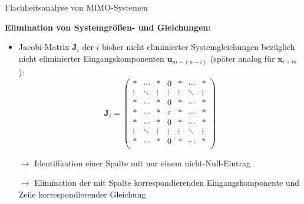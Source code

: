 \documentclass[
	ngerman,
	10pt,				%
	aspectratio=169 	%
]{beamer}
\begin{document}
\begin{frame}[t,fragile,label=Flachheit_3]{\large Flachheitsanalyse von MIMO-Systemen}
	
	\textbf{Elimination von Systemgrößen- und Gleichungen:}
	
	\begin{itemize}
		\pause
		\item Jacobi-Matrix $\mathbf{J}_i$ der $i$ bisher nicht eliminierter Systemgleichungen bezüglich nicht eliminierter Eingangskomponenten $\mathbf{u}_{m-(n-i)}$ (später analog für $\mathbf{x}_{i+m}$): \\
		\pause
		\begin{equation*}
			\mathbf{J}_i = 
			\begin{pmatrix}
				* & \cdots & * & 0 & * & \cdots & *\\
				\vdots & \ddots & \vdots & \vdots & \vdots & \ddots & \vdots \\
				* & \cdots & * & 0 & * & \cdots & *  \\
				* & \cdots & * & \varepsilon & * & \cdots & * \\
				* & \cdots & * & 0 & * & \cdots & *  \\
				\vdots & \ddots & \vdots & \vdots & \vdots & \ddots & \vdots \\
				* & \cdots & * & 0 & * & \cdots & *\\
			\end{pmatrix}
		\end{equation*}
		\pause
		\item[$\rightarrow$] Identifikation einer Spalte mit nur einem nicht-Null-Eintrag
		\pause
		\item[$\rightarrow$] Elimination der mit Spalte korrespondierenden Eingangskomponente und Zeile korrespondierender Gleichung
	\end{itemize}
	
\end{frame}

\end{document}
